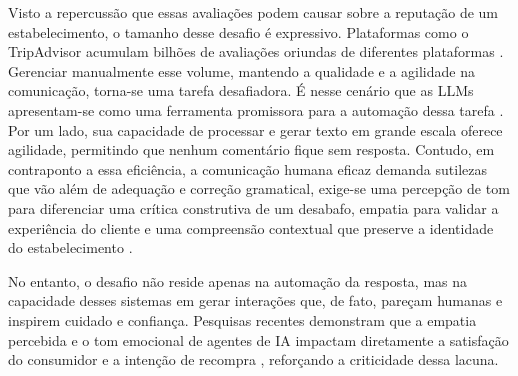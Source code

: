 
Visto a repercussão que essas avaliações podem causar sobre a reputação de um estabelecimento, o tamanho desse desafio é expressivo. Plataformas como o TripAdvisor acumulam bilhões de avaliações oriundas de diferentes plataformas \cite{tripadvisor2024}. Gerenciar manualmente esse volume, mantendo a qualidade e a agilidade na comunicação, torna-se uma tarefa desafiadora. É nesse cenário que as LLMs apresentam-se como uma ferramenta promissora para a automação dessa tarefa \cite{gamboa2023}. Por um lado, sua capacidade de processar e gerar texto em grande escala oferece agilidade, permitindo que nenhum comentário fique sem resposta. Contudo, em contraponto a essa eficiência, a comunicação humana eficaz demanda sutilezas que vão além de adequação e correção gramatical, exige-se uma percepção de tom para diferenciar uma crítica construtiva de um desabafo, empatia para validar a experiência do cliente e uma compreensão contextual que preserve a identidade do estabelecimento \cite{crolic2023}.

No entanto, o desafio não reside apenas na automação da resposta, mas na capacidade desses sistemas em gerar interações que, de fato, pareçam humanas e inspirem cuidado e confiança. Pesquisas recentes demonstram que a empatia percebida e o tom emocional de agentes de IA impactam diretamente a satisfação do consumidor e a intenção de recompra \cite{rohden2024}, reforçando a criticidade dessa lacuna.


